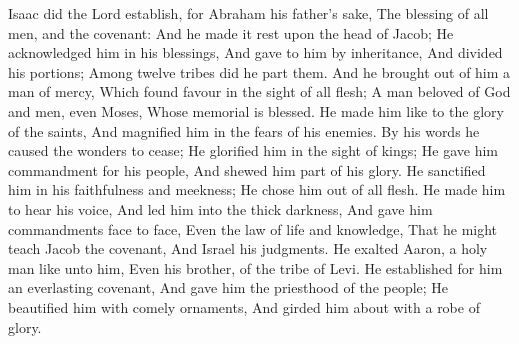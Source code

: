  Isaac did the Lord establish, for Abraham his father's sake, The blessing of all men, and the covenant: And he made it rest upon the head of Jacob; He acknowledged him in his blessings, And gave to him by inheritance, And divided his portions; Among twelve tribes did he part them. And he brought out of him a man of mercy, Which found favour in the sight of all flesh; A man beloved of God and men, even Moses, Whose memorial is blessed. He made him like to the glory of the saints, And magnified him in the fears of his enemies. By his words he caused the wonders to cease; He glorified him in the sight of kings; He gave him commandment for his people, And shewed him part of his glory. He sanctified him in his faithfulness and meekness; He chose him out of all flesh. He made him to hear his voice, And led him into the thick darkness, And gave him commandments face to face, Even the law of life and knowledge, That he might teach Jacob the covenant, And Israel his judgments. He exalted Aaron, a holy man like unto him, Even his brother, of the tribe of Levi. He established for him an everlasting covenant, And gave him the priesthood of the people; He beautified him with comely ornaments, And girded him about with a robe of glory.



